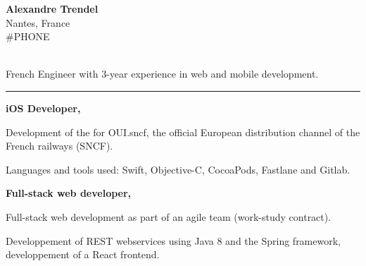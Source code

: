 \documentclass{cv}
\begin{document}
\pagestyle{empty}

\noindent\begin{minipage}[t]{0.3\textwidth}

\textbf{\large Alexandre Trendel} \\
Nantes, France \\
 #PHONE \\
 \href{mailto:#EMAIL}{} \\
 \href{https://github.com/xou816}{}

\end{minipage}
\hfill
\begin{minipage}[t]{0.5\textwidth}

\large

French Engineer with 3-year experience in web and mobile development.

\begin{center}\color{solred}\rule{2cm}{1pt}\end{center}

\end{minipage}

\vspace{1cm}


\begin{mainexpbox}[title=nov. 2019 -- today]

	\begin{minipage}[c]{20mm}
	\end{minipage}
	\begin{minipage}[c]{0.8\textwidth}

	\textbf{iOS Developer, \evtech{}}

	Development of the \href{https://apps.apple.com/fr/app/oui-sncf-train-et-bus/id343889987}{} for OUI.sncf, the official European distribution channel of the French railways (SNCF).

	Languages and tools used: Swift, Objective-C, CocoaPods, Fastlane and Gitlab.
	\end{minipage}

\end{mainexpbox}

\begin{expbox}[title={dec. 2016, \faicon{clock-o} 3 years}]

	\begin{minipage}[c]{20mm}
	\end{minipage}
	\begin{minipage}[c]{0.8\textwidth}

	\textbf{Full-stack web developer, \evtech{}}

	Full-stack web development as part of an agile team (work-study contract).

	Developpement of REST webservices using Java 8 and the Spring framework, developpement of a React frontend.
	\end{minipage}

\end{expbox}
\end{document}
